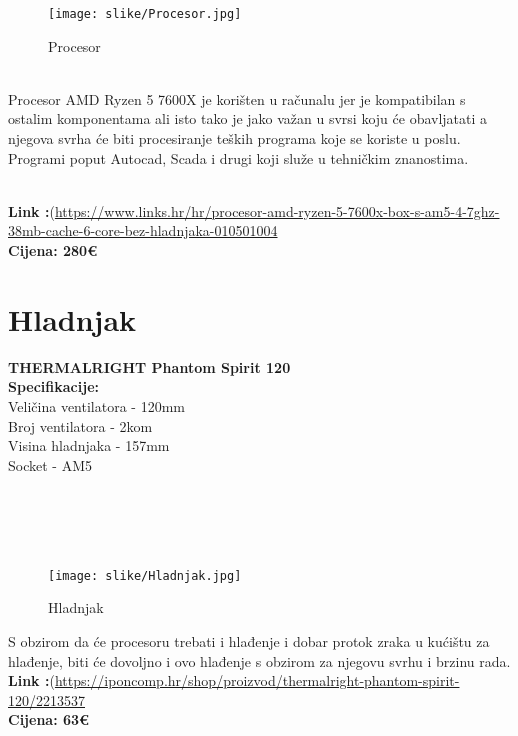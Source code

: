 \documentclass{article}
\begin{document}
\begin{figure}[h!]
    \centering
    \texttt{[image: slike/Procesor.jpg]}
    \caption{Procesor}
    \label{fig:method}
\end{figure}

\\ Procesor AMD Ryzen 5 7600X je korišten u računalu jer je kompatibilan s ostalim komponentama ali isto tako je jako važan u svrsi koju će obavljatati a njegova svrha će biti procesiranje teških programa koje se koriste u poslu. Programi poput Autocad, Scada i drugi koji služe u tehničkim znanostima.

\\ \textbf{Link :}(\url{https://www.links.hr/hr/procesor-amd-ryzen-5-7600x-box-s-am5-4-7ghz-38mb-cache-6-core-bez-hladnjaka-010501004}
\\ \textbf{Cijena: 280€}


\newpage

\section{Hladnjak}
\textbf{THERMALRIGHT Phantom Spirit 120}
\\
\textbf{Specifikacije:}
\\ Veličina ventilatora - 120mm
\\Broj ventilatora - 2kom
\\Visina hladnjaka - 157mm
\\ Socket - AM5 
\\
\\
\\
\\
\\

\begin{figure}[h!]
    \centering
    \texttt{[image: slike/Hladnjak.jpg]}
    \caption{Hladnjak}
    \label{fig:method}
\end{figure}
S obzirom da će procesoru trebati i hlađenje i dobar protok zraka u kućištu za hlađenje, biti će dovoljno i ovo hlađenje s obzirom za njegovu svrhu i brzinu rada.
\\ \textbf{Link :}(\url{https://iponcomp.hr/shop/proizvod/thermalright-phantom-spirit-120/2213537}
\\ \textbf{Cijena: 63€}

\newpage
\end{document}
